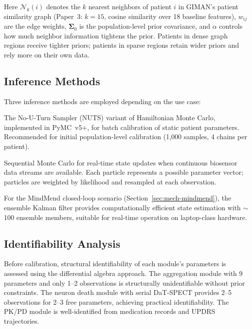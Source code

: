 Here $\mathcal{N}_k(i)$ denotes the $k$ nearest neighbors of patient $i$ in GIMAN's patient similarity graph (Paper~3: $k=15$, cosine similarity over 18 baseline features), $w_{ij}$ are the edge weights, $\boldsymbol{\Sigma}_0$ is the population-level prior covariance, and $\alpha$ controls how much neighbor information tightens the prior. Patients in dense graph regions receive tighter priors; patients in sparse regions retain wider priors and rely more on their own data.

\subsection{Inference Methods}

Three inference methods are employed depending on the use case:

\begin{description}[style=nextline]
\item[NUTS/HMC (Batch Calibration)] The No-U-Turn Sampler (NUTS) variant of Hamiltonian Monte Carlo, implemented in PyMC~v5+, for batch calibration of static patient parameters. Recommended for initial population-level calibration (1,000 samples, 4 chains per patient).

\item[Particle Filter (Online State Estimation)] Sequential Monte Carlo for real-time state updates when continuous biosensor data streams are available. Each particle represents a possible parameter vector; particles are weighted by likelihood and resampled at each observation.

\item[Ensemble Kalman Filter (Closed-Loop Operation)] For the MindMend closed-loop scenario (Section~\ref{sec:mech-mindmend}), the ensemble Kalman filter provides computationally efficient state estimation with $\sim$100 ensemble members, suitable for real-time operation on laptop-class hardware.
\end{description}

\subsection{Identifiability Analysis}

Before calibration, structural identifiability of each module's parameters is assessed using the differential algebra approach. The aggregation module with 9 parameters and only 1--2 observations is structurally unidentifiable without prior constraints. The neuron death module with serial DaT-SPECT provides 2--5 observations for 2--3 free parameters, achieving practical identifiability. The PK/PD module is well-identified from medication records and UPDRS trajectories.


